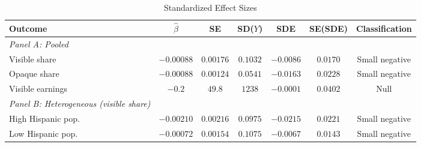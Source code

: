 \begin{table}[htbp]
\centering
\begin{threeparttable}
\caption{Standardized Effect Sizes}
\label{tab:sde}
\begin{adjustbox}{max width=\textwidth}
\begin{tabular}{lcccccc}
\toprule
Outcome & $\hat{\beta}$ & SE & SD($Y$) & SDE & SE(SDE) & Classification \\
\midrule
\textit{Panel A: Pooled} & & & & & & \\
Visible share & $-0.00088$ & $0.00176$ & $0.1032$ & $-0.0086$ & $0.0170$ & Small negative \\
Opaque share & $-0.00088$ & $0.00124$ & $0.0541$ & $-0.0163$ & $0.0228$ & Small negative \\
Visible earnings & $-0.2$ & $49.8$ & $1238$ & $-0.0001$ & $0.0402$ & Null \\
\addlinespace
\textit{Panel B: Heterogeneous (visible share)} & & & & & & \\
High Hispanic pop. & $-0.00210$ & $0.00216$ & $0.0975$ & $-0.0215$ & $0.0221$ & Small negative \\
Low Hispanic pop. & $-0.00072$ & $0.00154$ & $0.1075$ & $-0.0067$ & $0.0143$ & Small negative \\
\bottomrule
\end{tabular}
\end{adjustbox}
\begin{tablenotes}[flushleft]
\small

\end{tablenotes}
\end{threeparttable}
\end{table}
